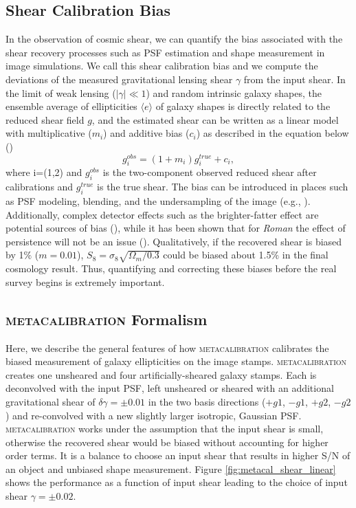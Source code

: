 \documentclass[fleqn,usenatbib]{mnras}
\begin{document}
\subsection{Shear Calibration Bias}
In the observation of cosmic shear, we can quantify the bias associated with the shear recovery processes such as PSF estimation and shape measurement in image simulations. We call this shear calibration bias and we compute the deviations of the measured gravitational lensing shear $\gamma$ from the input shear. In the limit of weak lensing ($\lvert\gamma\rvert\ll1$) and random intrinsic galaxy shapes, the ensemble average of ellipticities $\langle e \rangle$ of galaxy shapes is directly related to the reduced shear field $g$, and the estimated shear can be written as a linear model with multiplicative ($m_{i}$) and additive bias ($c_{i}$) as described in the equation below (\citealt{2006MNRAS.368.1323H, 2006MNRAS.366..101H, 2007MNRAS.376...13M}) 
\begin{equation}
    g^{obs}_{i} = (1+m_{i})g^{true}_{i} + c_{i}, 
    \label{eqn:linear}
\end{equation}
where i=(1,2) and $g^{obs}_{i}$ is the two-component observed reduced shear after calibrations and $g^{true}_{i}$ is the true shear. The bias can be introduced in places such as PSF modeling, blending, and the undersampling of the image (e.g., \citealt{2018ARA&A..56..393M}). Additionally, complex detector effects such as the brighter-fatter effect are potential sources of bias (\citealt{2013MNRAS.429..661M}), while it has been shown that for \emph{Roman} the effect of persistence will not be an issue (\citealt{2021arXiv210610273L}). Qualitatively, if the recovered shear is biased by 1$\%$ ($m=0.01$), $S_{8} = \sigma_{8} \sqrt{\Omega_{m}/0.3}$ could be biased about 1.5$\%$ in the final cosmology result. Thus, quantifying and correcting these biases before the real survey begins is extremely important. 

\subsection{\textsc{metacalibration} Formalism}
Here, we describe the general features of how \textsc{metacalibration} calibrates the biased measurement of galaxy ellipticities on the image stamps. \textsc{metacalibration} creates one unsheared and four artificially-sheared galaxy stamps. Each is deconvolved with the input PSF, left unsheared or sheared with an additional gravitational shear of $\delta\gamma=\pm 0.01$ in the two basis directions ($+g1$, $-g1$, $+g2$, $-g2$) and re-convolved with a new slightly larger isotropic, Gaussian PSF. \textsc{metacalibration} works under the assumption that the input shear is small, otherwise the recovered shear would be biased without accounting for higher order terms. It is a balance to choose an input shear that results in higher S/N of an object and unbiased shape measurement. Figure \ref{fig:metacal_shear_linear} shows the performance as a function of input shear leading to the choice of input shear $\gamma=\pm 0.02$. 
\end{document}
